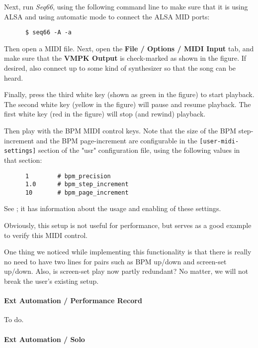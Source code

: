    Next, run \textsl{Seq66}, using the following command line to make
   sure that it is using ALSA and using automatic mode to connect the ALSA MID
   ports:

   \begin{verbatim}
      $ seq66 -A -a
   \end{verbatim}
   
   Then open a MIDI file.  Next,
   open the \textbf{File / Options / MIDI Input} tab, and make sure that
   the \textbf{VMPK Output} is check-marked as shown in the figure.
   If desired, also connect up to some kind of synthesizer so that the song can
   be heard.

   Finally, press the third white key (shown as green in the figure) to start
   playback.  The second white key (yellow in the figure) will pause and resume
   playback.  The first white key (red in the figure) will stop (and rewind)
   playback.

   Then play with the BPM MIDI control keys.  Note that the size of the
   BPM step-increment and the BPM page-increment are configurable in the
   \texttt{[user-midi-settings]} section of the "usr" configuration file,
   using the following values in that section:

   \begin{verbatim}
      1        # bpm_precision
      1.0      # bpm_step_increment
      10       # bpm_page_increment
   \end{verbatim}

   See ; it has
   information about the usage and enabling of these settings.

   Obviously, this setup is not useful for performance, but serves as a good
   example to verify this MIDI control.

   One thing we noticed while implementing this functionality is that there
   is really no need to have two lines for pairs such as BPM up/down and
   screen-set up/down.  Also, is screen-set play now partly redundant?
   No matter, we will not break the user's existing setup.

\paragraph{Ext Automation / Performance Record}
\label{paragraph:seq66_rc_file_midi_ctrl_ex_precord}

   To do.

\paragraph{Ext Automation / Solo}
\label{paragraph:seq66_rc_file_midi_ctrl_ex_solo}

